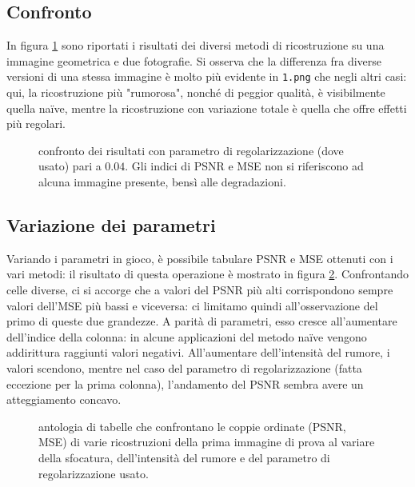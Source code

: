 \documentclass[a4paper]{article}
\begin{document}
\subsection{Confronto}
In figura \ref{fig:comparison} sono riportati i risultati dei diversi metodi di
ricostruzione su una immagine geometrica e due fotografie.
Si osserva che la differenza fra diverse versioni di una stessa immagine è molto
più evidente in \verb!1.png! che negli altri casi: qui, la ricostruzione più
"rumorosa", nonché di peggior qualità, è visibilmente quella naïve, mentre la
ricostruzione con variazione totale è quella che offre effetti più regolari.
\begin{figure}[H]
  \begin{center}
    \scalebox{0.75}{}
  \end{center}
  \caption{confronto dei risultati con parametro di regolarizzazione (dove
  usato) pari a $0.04$. Gli indici di PSNR e MSE non si riferiscono ad alcuna
  immagine presente, bensì alle degradazioni.}
  \label{fig:comparison}
\end{figure}
\subsection{Variazione dei parametri}
Variando i parametri in gioco, è possibile tabulare PSNR e MSE ottenuti con i
vari metodi: il risultato di questa operazione è mostrato in figura
\ref{fig:parameters}.
Confrontando celle diverse, ci si accorge che a valori del PSNR più alti
corrispondono sempre valori dell'MSE più bassi e viceversa: ci limitamo quindi
all'osservazione del primo di queste due grandezze. A parità di parametri, esso
cresce all'aumentare dell'indice della colonna: in alcune applicazioni del
metodo naïve vengono addirittura raggiunti valori negativi. All'aumentare
dell'intensità del rumore, i valori scendono, mentre nel caso del parametro di
regolarizzazione (fatta eccezione per la prima colonna), l'andamento del PSNR
sembra avere un atteggiamento concavo.
\begin{figure}[H]
  \begin{center}
    \scalebox{0.65}{}
  \end{center}
  \begin{center}
    \scalebox{0.65}{}
  \end{center}
  \begin{center}
    \scalebox{0.65}{}
  \end{center}
  \caption{antologia di tabelle che confrontano le coppie ordinate (PSNR, MSE)
  di varie ricostruzioni della prima immagine di prova al variare della
  sfocatura, dell'intensità del rumore e del parametro di regolarizzazione
  usato.}
  \label{fig:parameters}
\end{figure}
\end{document}
